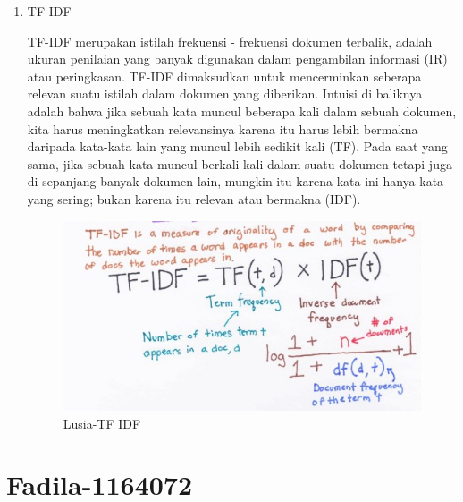 \begin{enumerate}
\item TF-IDF
	\par TF-IDF merupakan istilah frekuensi - frekuensi dokumen terbalik, adalah ukuran penilaian yang banyak digunakan dalam pengambilan informasi (IR) atau peringkasan. TF-IDF dimaksudkan untuk mencerminkan seberapa relevan suatu istilah dalam dokumen yang diberikan. Intuisi di baliknya adalah bahwa jika sebuah kata muncul beberapa kali dalam sebuah dokumen, kita harus meningkatkan relevansinya karena itu harus lebih bermakna daripada kata-kata lain yang muncul lebih sedikit kali (TF). Pada saat yang sama, jika sebuah kata muncul berkali-kali dalam suatu dokumen tetapi juga di sepanjang banyak dokumen lain, mungkin itu karena kata ini hanya kata yang sering; bukan karena itu relevan atau bermakna (IDF).
	\begin{figure}[ht]
		\centering
		\includegraphics[scale=0.5]{figures/m6.jpg}
		\caption{Lusia-TF IDF}
		\label{contoh}
	\end{figure}
\end{enumerate}






\par
\par
\par
\section{Fadila-1164072}
